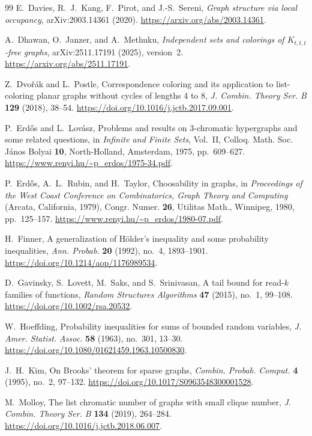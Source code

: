 \begin{thebibliography}{99}
E.~Davies, R.~J.~Kang, F.~Pirot, and J.-S.~Sereni,
\emph{Graph structure via local occupancy},
arXiv:2003.14361 (2020).
\url{https://arxiv.org/abs/2003.14361}.

A.~Dhawan, O.~Janzer, and A.~Methuku,
\emph{Independent sets and colorings of $K_{t,t,t}$-free graphs},
arXiv:2511.17191 (2025), version~2.
\url{https://arxiv.org/abs/2511.17191}.

Z.~Dvo\v{r}\'ak and L.~Postle,
Correspondence coloring and its application to list-coloring planar graphs
without cycles of lengths 4 to 8,
\emph{J. Combin. Theory Ser. B} \textbf{129} (2018), 38--54.
\url{https://doi.org/10.1016/j.jctb.2017.09.001}.

P.~Erd\H{o}s and L.~Lov\'asz,
Problems and results on $3$-chromatic hypergraphs and some related questions,
in \emph{Infinite and Finite Sets}, Vol.~II,
Colloq. Math. Soc. J\'anos Bolyai \textbf{10},
North-Holland, Amsterdam, 1975, pp.~609--627.
\url{https://www.renyi.hu/~p_erdos/1975-34.pdf}.

P.~Erd\H{o}s, A.~L.~Rubin, and H.~Taylor,
Choosability in graphs,
in \emph{Proceedings of the West Coast Conference on Combinatorics,
Graph Theory and Computing} (Arcata, California, 1979),
Congr. Numer. \textbf{26}, Utilitas Math., Winnipeg, 1980, pp.~125--157.
\url{https://www.renyi.hu/~p_erdos/1980-07.pdf}.

H.~Finner,
A generalization of H\"older's inequality and some probability inequalities,
\emph{Ann. Probab.} \textbf{20} (1992), no.~4, 1893--1901.
\url{https://doi.org/10.1214/aop/1176989534}.

D.~Gavinsky, S.~Lovett, M.~Saks, and S.~Srinivasan,
A tail bound for read-$k$ families of functions,
\emph{Random Structures Algorithms} \textbf{47} (2015), no.~1, 99--108.
\url{https://doi.org/10.1002/rsa.20532}.

W.~Hoeffding,
Probability inequalities for sums of bounded random variables,
\emph{J. Amer. Statist. Assoc.} \textbf{58} (1963), no.~301, 13--30.
\url{https://doi.org/10.1080/01621459.1963.10500830}.

J.~H.~Kim,
On Brooks' theorem for sparse graphs,
\emph{Combin. Probab. Comput.} \textbf{4} (1995), no.~2, 97--132.
\url{https://doi.org/10.1017/S0963548300001528}.

M.~Molloy,
The list chromatic number of graphs with small clique number,
\emph{J. Combin. Theory Ser. B} \textbf{134} (2019), 264--284.
\url{https://doi.org/10.1016/j.jctb.2018.06.007}.


\end{thebibliography}
